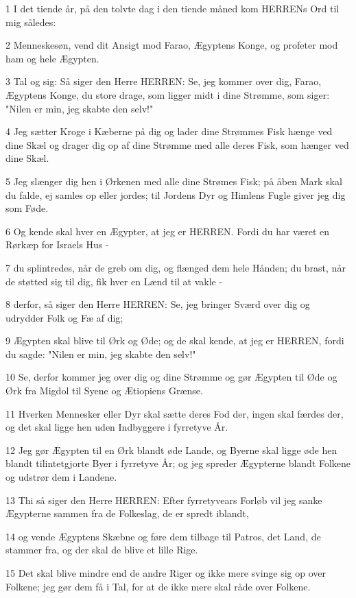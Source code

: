 \par 1 I det tiende år, på den tolvte dag i den tiende måned kom HERRENs Ord til mig således:
\par 2 Menneskesøn, vend dit Ansigt mod Farao, Ægyptens Konge, og profeter mod ham og hele Ægypten.
\par 3 Tal og sig: Så siger den Herre HERREN: Se, jeg kommer over dig, Farao, Ægyptens Konge, du store drage, som ligger midt i dine Strømme, som siger: "Nilen er min, jeg skabte den selv!"
\par 4 Jeg sætter Kroge i Kæberne på dig og lader dine Strømmes Fisk hænge ved dine Skæl og drager dig op af dine Strømme med alle deres Fisk, som hænger ved dine Skæl.
\par 5 Jeg slænger dig hen i Ørkenen med alle dine Strømes Fisk; på åben Mark skal du falde, ej samles op eller jordes; til Jordens Dyr og Himlens Fugle giver jeg dig som Føde.
\par 6 Og kende skal hver en Ægypter, at jeg er HERREN. Fordi du har været en Rørkæp for Israels Hus -
\par 7 du splintredes, når de greb om dig, og flænged dem hele Hånden; du brast, når de støtted sig til dig, fik hver en Lænd til at vakle -
\par 8 derfor, så siger den Herre HERREN: Se, jeg bringer Sværd over dig og udrydder Folk og Fæ af dig;
\par 9 Ægypten skal blive til Ørk og Øde; og de skal kende, at jeg er HERREN, fordi du sagde: "Nilen er min, jeg skabte den selv!"
\par 10 Se, derfor kommer jeg over dig og dine Strømme og gør Ægypten til Øde og Ørk fra Migdol til Syene og Ætiopiens Grænse.
\par 11 Hverken Mennesker eller Dyr skal sætte deres Fod der, ingen skal færdes der, og det skal ligge hen uden Indbyggere i fyrretyve År.
\par 12 Jeg gør Ægypten til en Ørk blandt øde Lande, og Byerne skal ligge øde hen blandt tilintetgjorte Byer i fyrretyve År; og jeg spreder Ægypterne blandt Folkene og udstrør dem i Landene.
\par 13 Thi så siger den Herre HERREN: Efter fyrretyvears Forløb vil jeg sanke Ægypterne sammen fra de Folkeslag, de er spredt iblandt,
\par 14 og vende Ægyptens Skæbne og føre dem tilbage til Patros, det Land, de stammer fra, og der skal de blive et lille Rige.
\par 15 Det skal blive mindre end de andre Riger og ikke mere svinge sig op over Folkene; jeg gør dem få i Tal, for at de ikke mere skal råde over Folkene.
